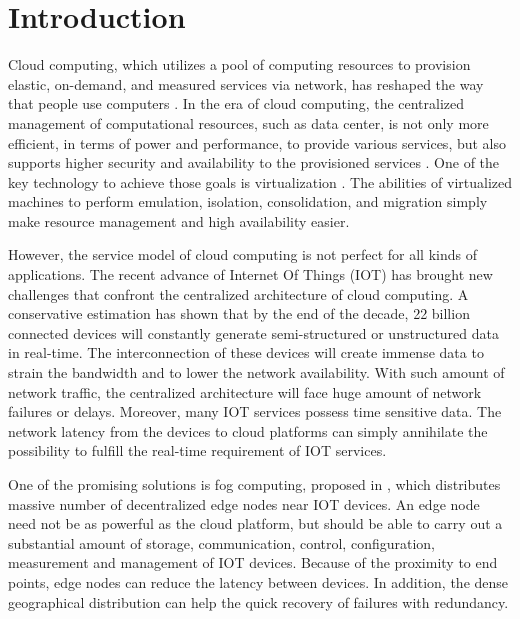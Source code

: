 \chapter{Introduction}
\label{chap:intro}
Cloud computing, which utilizes a pool of computing resources to provision elastic, on-demand, and measured services via network, has reshaped the way that people use computers \cite{armbrust2010view}.  In the era of cloud computing, the centralized management of computational resources, such as data center, is not only more efficient, in terms of power and performance, to provide various services, but also supports higher security and availability to the provisioned services \cite{cully2008remus,gray1991high}.  One of the key technology to achieve those goals is virtualization \cite{goldberg1974survey, miller2007virtualization, yan2011development, singh2008server, chowdhury2010survey}. The abilities of virtualized machines to perform emulation, isolation, consolidation, and migration simply make resource management and high availability easier.

However, the service model of cloud computing is not perfect for all kinds of applications.  The recent advance of Internet Of Things (IOT) has brought new challenges that confront the centralized architecture of cloud computing.  A conservative estimation has shown that by the end of the decade, 22 billion connected devices will constantly generate semi-structured or unstructured data in real-time.  The interconnection of these devices will create immense data to strain the bandwidth and to lower the network availability. With such amount of network traffic, the centralized architecture will face huge amount of network failures or delays.  Moreover, many IOT services possess time sensitive data.  The network latency from the devices to cloud platforms can simply annihilate the possibility to fulfill the real-time requirement of IOT services.

One of the promising solutions is fog computing, proposed in \cite{bonomi2012fog,stolfo2012fog}, which distributes massive number of decentralized edge nodes near IOT devices.  An edge node need not be as powerful as the cloud platform, but should be able to carry out a substantial amount of storage, communication, control, configuration, measurement and management of IOT devices.  Because of the proximity to end points, edge nodes can reduce the latency between devices.  In addition, the dense geographical distribution can help the quick recovery of failures with redundancy.

